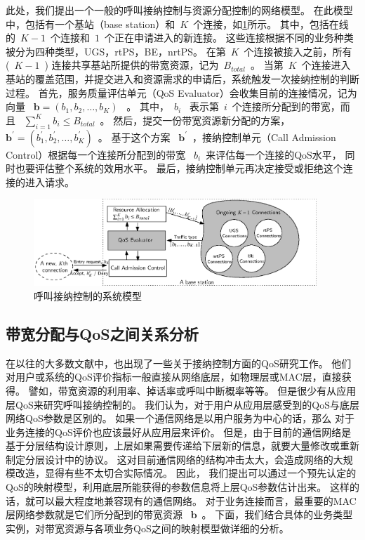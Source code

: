 此处，我们提出一个一般的呼叫接纳控制与资源分配控制的网络模型。
在此模型中，包括有一个基站（base station）和~$K$~个连接，如\ref{fig_system_model_cac}所示。
其中，包括在线的~$K-1$~个连接和~$1$~个正在申请进入的新连接。
这些连接根据不同的业务种类被分为四种类型，UGS，rtPS，BE，nrtPS。
在第~$K$~个连接被接入之前，所有 (~$K-1$~) 连接共享基站所提供的带宽资源，记为~$B_{total}$~。
当第~$K$~个连接进入基站的覆盖范围，并提交进入和资源需求的申请后，系统触发一次接纳控制的判断过程。
首先，服务质量评估单元（QoS Evaluator）会收集目前的连接情况，记为向量 ~$\mathbf{b} = (b_1, b_2, \dots, b_K)$~ 。
其中，~$b_i$~ 表示第~$i$~个连接所分配到的带宽，而且 ~$\sum_{i=1}^K b_i \le B_{total}$~。
然后，提交一份带宽资源新分配的方案，~$\mathbf{b^\prime} = (b_1^\prime, b_2^\prime, \dots, b_K^\prime)$~。
基于这个方案 ~$\mathbf{b^\prime}$~，接纳控制单元（Call Admission Control）根据每一个连接所分配到的带宽 ~$b_i$~来评估每一个连接的QoS水平，
同时也要评估整个系统的效用水平。
最后，接纳控制单元再决定接受或拒绝这个连接的进入请求。
\begin{figure}[t]
\centering
\includegraphics[width=0.95\textwidth]{cacop_qos_model_system.eps}
\caption{ 呼叫接纳控制的系统模型} \label{fig_system_model_cac}
\end{figure}
\subsection{带宽分配与QoS之间关系分析}
在以往的大多数文献中，也出现了一些关于接纳控制方面的QoS研究工作。
他们对用户或系统的QoS评价指标一般直接从网络底层，如物理层或MAC层，直接获得。
譬如，带宽资源的利用率、掉话率或呼叫中断概率等等。
但是很少有从应用层QoS来研究呼叫接纳控制的。
我们认为，对于用户从应用层感受到的QoS与底层网络QoS参数是区别的。
如果一个通信网络是以用户服务为中心的话，那么
对于业务连接的QoS评价也应该最好从应用层来评价。
但是，由于目前的通信网络是基于分层结构设计原则，上层如果需要传递给下层新的信息，就要大量修改或重新制定分层设计中的协议。
这对目前通信网络的结构冲击太大，会造成网络的大规模改造，显得有些不太切合实际情况。
因此，
我们提出可以通过一个预先认定的QoS的映射模型，利用底层所能获得的参数信息将上层QoS参数估计出来。
这样的话，就可以最大程度地兼容现有的通信网络。
对于业务连接而言，最重要的MAC层网络参数就是它们所分配到的带宽资源 ~$\mathbf{b}$~。
下面，我们结合具体的业务类型实例，对带宽资源与各项业务QoS之间的映射模型做详细的分析。

